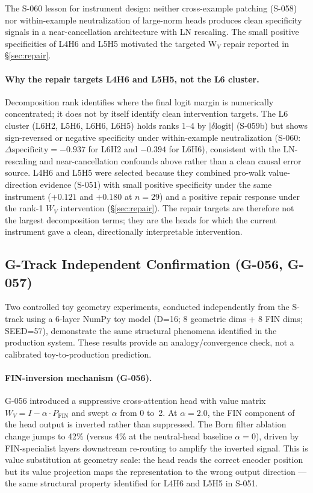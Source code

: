 The S-060 lesson for instrument design: neither cross-example patching (S-058) nor
within-example neutralization of large-norm heads produces clean specificity signals
in a near-cancellation architecture with LN rescaling.
The small positive specificities of L4H6 and L5H5 motivated the targeted W$_V$
repair reported in \S\ref{sec:repair}.

\paragraph{Why the repair targets L4H6 and L5H5, not the L6 cluster.}
Decomposition rank identifies where the final logit margin is numerically concentrated;
it does not by itself identify clean intervention targets.
The L6 cluster (L6H2, L5H6, L6H6, L6H5) holds ranks 1--4 by $|\delta\text{logit}|$
(S-059b) but shows sign-reversed or negative specificity under within-example
neutralization (S-060: $\Delta\text{specificity}=-0.937$ for L6H2 and $-0.394$ for
L6H6), consistent with the LN-rescaling and near-cancellation confounds above rather
than a clean causal error source.
L4H6 and L5H5 were selected because they combined pro-walk value-direction evidence
(S-051) with small positive specificity under the same instrument
($+0.121$ and $+0.180$ at $n=29$) and a positive repair response under the rank-1
$W_V$ intervention (\S\ref{sec:repair}).
The repair targets are therefore not the largest decomposition terms; they are the
heads for which the current instrument gave a clean, directionally interpretable
intervention.

\subsection{G-Track Independent Confirmation (G-056, G-057)}

Two controlled toy geometry experiments, conducted independently from the S-track using
a 6-layer NumPy toy model (D=16; 8 geometric dims + 8 FIN dims; SEED=57), demonstrate
the same structural phenomena identified in the production system.
These results provide an analogy/convergence check, not a calibrated toy-to-production
prediction.

\paragraph{FIN-inversion mechanism (G-056).}
G-056 introduced a suppressive cross-attention head with value matrix
$W_V = I - \alpha \cdot P_\text{FIN}$ and swept $\alpha$ from 0 to~2.
At $\alpha=2.0$, the FIN component of the head output is inverted rather than suppressed.
The Born filter ablation change jumps to 42\% (versus 4\% at the neutral-head baseline
$\alpha=0$), driven by FIN-specialist layers downstream re-routing to amplify the
inverted signal.
This is value substitution at geometry scale: the head reads the correct encoder
position but its value projection maps the representation to the wrong output direction
--- the same structural property identified for L4H6 and L5H5 in S-051.

